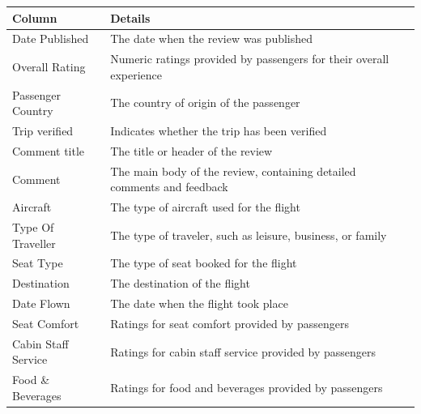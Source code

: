 \documentclass[11pt]{article} %
\begin{document}
\begin{table}[H]
\begin{tabular}{@{}ll@{}}
\toprule
{\color[HTML]{343434} \textbf{Column}}          & \textbf{Details}                                                         \\ \midrule
{\color[HTML]{343434} Date Published}           & The date when the review was   published                                 \\
{\color[HTML]{343434} Overall Rating}           & Numeric ratings provided by   passengers for their overall experience    \\
{\color[HTML]{343434} Passenger   Country}      & The country of origin of the   passenger                                 \\
{\color[HTML]{343434} Trip   verified}          & Indicates whether the trip has   been verified                           \\
{\color[HTML]{343434} Comment   title}          & The title or header of the review                                        \\
{\color[HTML]{343434} Comment}                  & The main body of the review,   containing detailed comments and feedback \\
{\color[HTML]{343434} Aircraft}                 & The type of aircraft used for the   flight                               \\
{\color[HTML]{343434} Type   Of Traveller}      & The type of traveler, such as   leisure, business, or family             \\
{\color[HTML]{343434} Seat   Type}              & The type of seat booked for the   flight                                 \\
{\color[HTML]{343434} Destination}              & The destination of the flight                                            \\
{\color[HTML]{343434} Date   Flown}             & The date when the flight took   place                                    \\
{\color[HTML]{343434} Seat   Comfort}           & Ratings for seat comfort provided   by passengers                        \\
{\color[HTML]{343434} Cabin   Staff Service}    & Ratings for cabin staff service   provided by passengers                 \\
{\color[HTML]{343434} Food   \& Beverages}      & Ratings for food and beverages   provided by passengers                  \\

\end{tabular}
\end{table}
\end{document}
